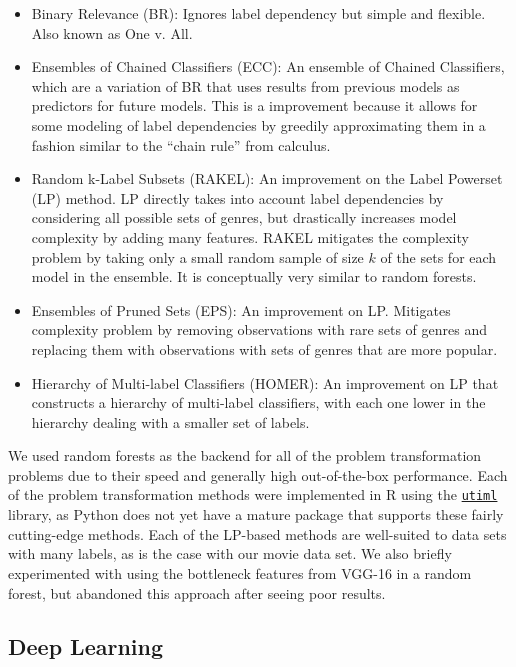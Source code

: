 \documentclass{article}
\begin{document}
        \begin{itemize}
            \item Binary Relevance (BR): Ignores label dependency but simple and flexible. Also known as One v. All.
            \item Ensembles of Chained Classifiers (ECC): An ensemble of Chained Classifiers, which are a variation of BR that uses results from previous models as predictors for future models. This is a improvement because it allows for some modeling of label dependencies by greedily approximating them in a fashion similar to the ``chain rule'' from calculus. 
            \item Random k-Label Subsets (RAKEL): An improvement on the Label Powerset (LP) method. LP directly takes into account label dependencies by considering all possible sets of genres, but drastically increases model complexity by adding many features. RAKEL mitigates the complexity problem by taking only a small random sample of size $k$ of the sets for each model in the ensemble. It is conceptually very similar to random forests.
            \item Ensembles of Pruned Sets (EPS): An improvement on LP. Mitigates complexity problem by removing observations with rare sets of genres and replacing them with observations with sets of genres that are more popular. 
            \item Hierarchy of Multi-label Classifiers (HOMER): An improvement on LP that constructs a hierarchy of multi-label classifiers, with each one lower in the hierarchy dealing with a smaller set of labels.
        \end{itemize}
        
        We used random forests as the backend for all of the problem transformation problems due to their speed and generally high out-of-the-box performance. Each of the problem transformation methods were implemented in R using the \href{https://cran.r-project.org/web/packages/utiml/utiml.pdf}{\texttt{utiml}} library, as Python does not yet have a mature package that supports these fairly cutting-edge methods.  Each of the LP-based methods are well-suited to data sets with many labels, as is the case with our movie data set. We also briefly experimented with using the bottleneck features from VGG-16 in a random forest, but abandoned this approach after seeing poor results.
    
    \subsection{Deep Learning}
        \indent 
        
\end{document}
